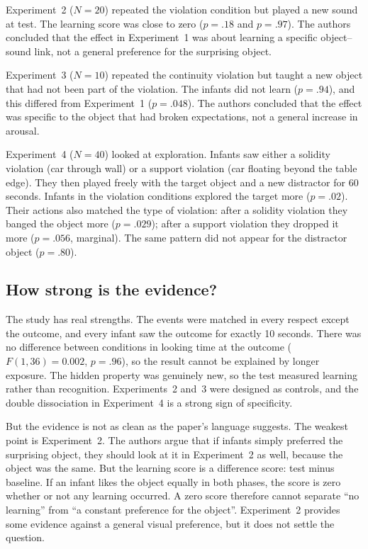 \documentclass{article}
\begin{document}
Experiment~2 ($N=20$) repeated the violation condition but played a new sound at test. The
learning score was close to zero ($p=.18$ and $p=.97$). The authors concluded that the
effect in Experiment~1 was about learning a specific object--sound link, not a general
preference for the surprising object.

Experiment~3 ($N=10$) repeated the continuity violation but taught a new object that had
not been part of the violation. The infants did not learn ($p=.94$), and this differed from
Experiment~1 ($p=.048$). The authors concluded that the effect was specific to the object
that had broken expectations, not a general increase in arousal.

Experiment~4 ($N=40$) looked at exploration. Infants saw either a solidity violation (car
through wall) or a support violation (car floating beyond the table edge). They then
played freely with the target object and a new distractor for 60 seconds. Infants in the
violation conditions explored the target more ($p=.02$). Their actions also matched the
type of violation: after a solidity violation they banged the object more ($p=.029$);
after a support violation they dropped it more ($p=.056$, marginal). The same pattern did
not appear for the distractor object ($p=.80$).

\subsection{How strong is the evidence?}

The study has real strengths. The events were matched in every respect except the outcome,
and every infant saw the outcome for exactly 10 seconds. There was no difference between
conditions in looking time at the outcome ($F(1,36)=0.002$, $p=.96$), so the result cannot
be explained by longer exposure. The hidden property was genuinely new, so the test
measured learning rather than recognition. Experiments~2 and~3 were designed as controls,
and the double dissociation in Experiment~4 is a strong sign of specificity.

But the evidence is not as clean as the paper's language suggests. The weakest point is
Experiment~2. The authors argue that if infants simply preferred the surprising object,
they should look at it in Experiment~2 as well, because the object was the same. But the
learning score is a difference score: test minus baseline. If an infant likes the object
equally in both phases, the score is zero whether or not any learning occurred. A zero
score therefore cannot separate ``no learning'' from ``a constant preference for the
object''. Experiment~2 provides some evidence against a general visual preference, but it
does not settle the question.
\end{document}
